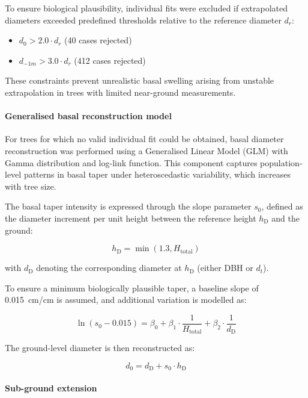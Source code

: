 \documentclass[twocolumn, bibliography=totoc]{scrartcl}
\begin{document}
To ensure biological plausibility, individual fits were excluded if extrapolated diameters exceeded predefined thresholds relative to the reference diameter $d_r$:
\begin{itemize}
\item $d_0 > 2.0 \cdot d_r$ (40 cases rejected)
\item $d_{-1m} > 3.0 \cdot d_r$ (412 cases rejected)
\end{itemize}

These constraints prevent unrealistic basal swelling arising from unstable extrapolation in trees with limited near-ground measurements.

\paragraph{Generalised basal reconstruction model}

For trees for which no valid individual fit could be obtained, basal diameter reconstruction was performed using a Generalised Linear Model (GLM) with Gamma distribution and log-link function. This component captures population-level patterns in basal taper under heteroscedastic variability, which increases with tree size.

The basal taper intensity is expressed through the slope parameter $s_0$, defined as the diameter increment per unit height between the reference height $h_{\text{D}}$ and the ground:

\begin{equation}
h_{\text{D}} = \min(1.3, H_{\text{total}})
\end{equation}

with $d_{\text{D}}$ denoting the corresponding diameter at $h_{\text{D}}$ (either DBH or $d_t$).

To ensure a minimum biologically plausible taper, a baseline slope of \qty{0.015}{cm/cm} is assumed, and additional variation is modelled as:

\begin{equation}
\ln(s_0 - 0.015) = \beta_0 + \beta_1 \cdot \frac{1}{H_{\text{total}}} + \beta_2 \cdot \frac{1}{d_{\text{D}}}
\end{equation}

The ground-level diameter is then reconstructed as:

\begin{equation}
d_0 = d_{\text{D}} + s_0 \cdot h_{\text{D}}
\end{equation}

\paragraph{Sub-ground extension}
\end{document}
